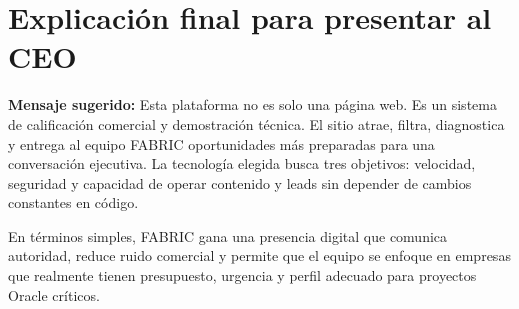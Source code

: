 \documentclass[11pt,letterpaper]{article}
\begin{document}
\section{Explicaci\'on final para presentar al CEO}

\begin{executivebox}
\textbf{Mensaje sugerido:} Esta plataforma no es solo una p\'agina web. Es un sistema de calificaci\'on comercial y demostraci\'on t\'ecnica. El sitio atrae, filtra, diagnostica y entrega al equipo FABRIC oportunidades m\'as preparadas para una conversaci\'on ejecutiva. La tecnolog\'ia elegida busca tres objetivos: velocidad, seguridad y capacidad de operar contenido y leads sin depender de cambios constantes en c\'odigo.
\end{executivebox}

En t\'erminos simples, FABRIC gana una presencia digital que comunica autoridad, reduce ruido comercial y permite que el equipo se enfoque en empresas que realmente tienen presupuesto, urgencia y perfil adecuado para proyectos Oracle cr\'iticos.
\end{document}
